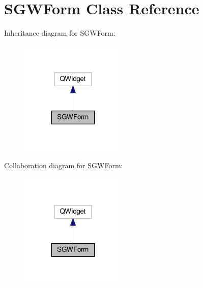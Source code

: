 \hypertarget{class_s_g_w_form}{}\section{S\+G\+W\+Form Class Reference}
\label{class_s_g_w_form}


Inheritance diagram for S\+G\+W\+Form\+:
\nopagebreak
\begin{figure}[H]
\begin{center}
\leavevmode
\includegraphics[width=143pt]{class_s_g_w_form__inherit__graph}
\end{center}
\end{figure}


Collaboration diagram for S\+G\+W\+Form\+:
\nopagebreak
\begin{figure}[H]
\begin{center}
\leavevmode
\includegraphics[width=143pt]{class_s_g_w_form__coll__graph}
\end{center}
\end{figure}
